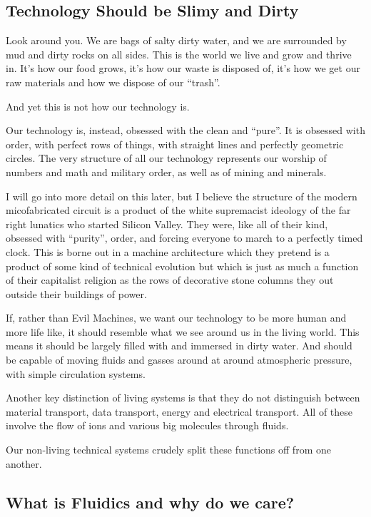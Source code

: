 \subsection{Technology Should be Slimy and
Dirty}\label{technology-should-be-slimy-and-dirty}

Look around you. We are bags of salty dirty water, and we are surrounded
by mud and dirty rocks on all sides. This is the world we live and grow
and thrive in. It's how our food grows, it's how our waste is disposed
of, it's how we get our raw materials and how we dispose of our
``trash''.

And yet this is not how our technology is.

Our technology is, instead, obsessed with the clean and ``pure''. It is
obsessed with order, with perfect rows of things, with straight lines
and perfectly geometric circles. The very structure of all our
technology represents our worship of numbers and math and military
order, as well as of mining and minerals.

I will go into more detail on this later, but I believe the structure of
the modern micofabricated circuit is a product of the white supremacist
ideology of the far right lunatics who started Silicon Valley. They
were, like all of their kind, obsessed with ``purity'', order, and
forcing everyone to march to a perfectly timed clock. This is borne out
in a machine architecture which they pretend is a product of some kind
of technical evolution but which is just as much a function of their
capitalist religion as the rows of decorative stone columns they out
outside their buildings of power.

If, rather than Evil Machines, we want our technology to be more human
and more life like, it should resemble what we see around us in the
living world. This means it should be largely filled with and immersed
in dirty water. And should be capable of moving fluids and gasses around
at around atmospheric pressure, with simple circulation systems.

Another key distinction of living systems is that they do not
distinguish between material transport, data transport, energy and
electrical transport. All of these involve the flow of ions and various
big molecules through fluids.

Our non-living technical systems crudely split these functions off from
one another.

\subsection{What is Fluidics and why do we
care?}\label{what-is-fluidics-and-why-do-we-care}

